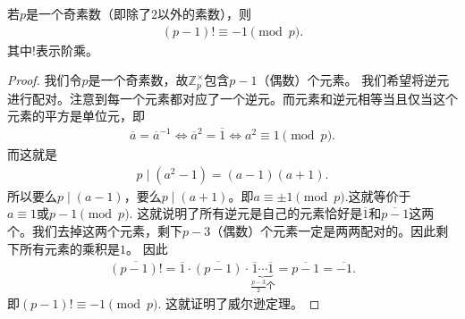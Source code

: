 \documentclass[../../main.tex]{subfiles}
\begin{document}
\begin{theorem}[Wilson定理]\label{theorem:Wilson}
若$p$是一个奇素数（即除了$2$以外的素数），则
\begin{align*}
(p - 1)! \equiv -1 \pmod{p} .
\end{align*}
其中$!$表示阶乘。
\end{theorem}
\begin{proof}
我们令$p$是一个奇素数，故$\mathbb{Z}_p^\times$包含$p - 1$（偶数）个元素。
我们希望将逆元进行配对。注意到每一个元素都对应了一个逆元。而元素和逆元相等当且仅当这个元素的平方是单位元，即
\begin{align*}
\overline{a} = \overline{a}^{-1} \iff \overline{a}^2=\overline{1} \iff a^2 \equiv 1 \pmod{p} .
\end{align*}
而这就是
\begin{align*}
p \mid (a^2 - 1) = (a - 1)(a + 1) .
\end{align*}
所以要么$p \mid (a - 1)$，要么$p \mid (a + 1)$。即$a \equiv \pm 1 \pmod{p}$.这就等价于$a \equiv 1\text{或}p-1 \pmod{p} .$
这就说明了所有逆元是自己的元素恰好是$\overline{1}$和$\overline{p-1}$这两个。我们去掉这两个元素，剩下$p - 3$（偶数）个元素一定是两两配对的。因此剩下所有元素的乘积是$1$。
因此
\begin{align*}
\overline{(p-1)!}=\overline{1}\cdot \overline{(p-1)}\cdot \underset{\frac{p-3}{2}\text{个}}{\underbrace{\overline{1}\cdots \overline{1}}}=\overline{p-1}=\overline{-1}.
\end{align*}
即$(p-1)!\equiv -1 \pmod{p}.$
这就证明了威尔逊定理。 
\end{proof}
\end{document}
